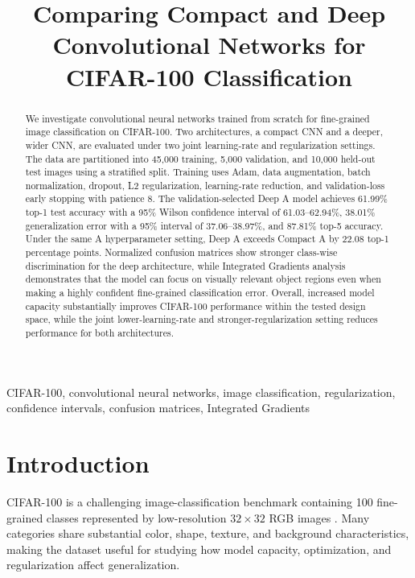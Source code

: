 \documentclass[conference]{IEEEtran}
\begin{document}
\title{Comparing Compact and Deep Convolutional Networks for CIFAR-100 Classification}

\author{
}

\maketitle

\begin{abstract}
We investigate convolutional neural networks trained from scratch for fine-grained image classification on CIFAR-100. Two architectures, a compact CNN and a deeper, wider CNN, are evaluated under two joint learning-rate and regularization settings. The data are partitioned into 45,000 training, 5,000 validation, and 10,000 held-out test images using a stratified split. Training uses Adam, data augmentation, batch normalization, dropout, L2 regularization, learning-rate reduction, and validation-loss early stopping with patience 8. The validation-selected Deep A model achieves 61.99\% top-1 test accuracy with a 95\% Wilson confidence interval of 61.03--62.94\%, 38.01\% generalization error with a 95\% interval of 37.06--38.97\%, and 87.81\% top-5 accuracy. Under the same A hyperparameter setting, Deep A exceeds Compact A by 22.08 top-1 percentage points. Normalized confusion matrices show stronger class-wise discrimination for the deep architecture, while Integrated Gradients analysis demonstrates that the model can focus on visually relevant object regions even when making a highly confident fine-grained classification error. Overall, increased model capacity substantially improves CIFAR-100 performance within the tested design space, while the joint lower-learning-rate and stronger-regularization setting reduces performance for both architectures.
\end{abstract}

\begin{IEEEkeywords}
CIFAR-100, convolutional neural networks, image classification, regularization, confidence intervals, confusion matrices, Integrated Gradients
\end{IEEEkeywords}


\section{Introduction}

CIFAR-100 is a challenging image-classification benchmark containing 100 fine-grained classes represented by low-resolution $32\times32$ RGB images \cite{cifar}. Many categories share substantial color, shape, texture, and background characteristics, making the dataset useful for studying how model capacity, optimization, and regularization affect generalization.
\end{document}

